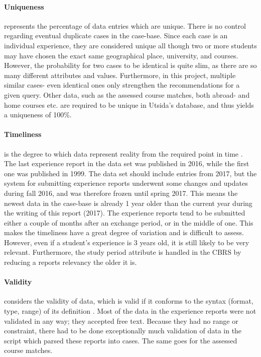 \paragraph{Uniqueness} represents the percentage of data entries which are unique. There is no control regarding eventual duplicate cases in the case-base. Since each case is an individual experience, they are considered unique all though two or more students may have chosen the exact same geographical place, university, and courses. However, the probability for two cases to be identical is quite slim, as there are so many different attributes and values. Furthermore, in this project, multiple similar cases- even identical ones only strengthen the recommendations for a given query. Other data, such as the assessed course matches, both abroad- and home courses etc. are required to be unique in Utsida's database, and thus yields a uniqueness of 100\%.

\paragraph{Timeliness} is the degree to which data represent reality from the required point in time \cite{askham2013six}. The last experience report in the data set was published in 2016, while the first one was published in 1999. The data set should include entries from 2017, but the system for submitting experience reports underwent some changes and updates during fall 2016, and was therefore frozen until spring 2017. This means the newest data in the case-base is already 1 year older than the current year during the writing of this report (2017). The experience reports tend to be submitted either a couple of months after an exchange period, or in the middle of one. This makes the timeliness have a great degree of variation and is difficult to assess. However, even if a student's experience is 3 years old, it is still likely to be very relevant. Furthermore, the study period attribute is handled in the CBRS by reducing a reports relevancy the older it is.

\paragraph{Validity} considers the validity of data, which is valid if it conforms to the syntax (format, type, range) of its definition \cite{askham2013six}. Most of the data in the experience reports were not validated in any way; they accepted free text. Because they had no range or constraint, there had to be done exceptionally much validation of data in the script which parsed these reports into cases. The same goes for the assessed course matches.

